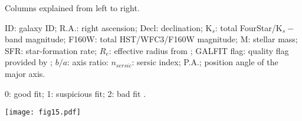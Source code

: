 \documentclass{emulateapj}
\newcommand{\tf}{Tully-Fisher}
\begin{document}
\begin{table*}
\begin{center}
\caption{Full sample}
\begin{scriptsize}
\begin{threeparttable}

\begin{tablenotes}
\item {Columns explained from left to right.}
\item {ID: galaxy ID; R.A.: right ascension; Decl: declination; K$_s$: total FourStar/K$_s-$band magnitude; F160W: total HST/WFC3/F160W magnitude; M: stellar mass; SFR: star-formation rate; $R_e$: effective radius from \citet{vanderWel14a}; GALFIT flag: quality flag provided by \citet{vanderWel14a}; $b/a$: axis ratio: $n_{sersic}$: sersic index; P.A.; position angle of the major axis.}
\item[a] 0: good fit; 1: suspicious fit; 2: bad fit \citep{vanderWel12}.
\end{tablenotes}
\end{threeparttable}
\end{scriptsize}
\label{t:tg}
\end{center}
\end{table*}

\begin{figure*}
\begin{center}
\texttt{[image: fig15.pdf]}
\caption{Rest-frame $U-V$ colours, stellar masses and ZFOURGE $K_s$-band magnitudes for the {22} galaxies used here to derive the \tf\ relation (green), the ZFIRE target sample (lightblue), and a parent sample drawn from ZFOURGE with $2<z<2.5$ and $M/M_{\odot}>10^9$ (gray). The gray histograms were reduced by a factor of three for reasons of visibility. The {22} galaxies of this study have a large range in $U-V$, stellar mass and brightness.}
\label{fig:samplehist}
\end{center}
\end{figure*}
\end{document}
